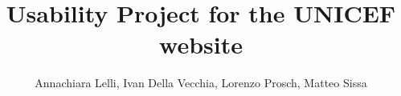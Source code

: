 \documentclass[a4paper,12pt]{article}
\author{Annachiara Lelli, Ivan Della Vecchia, Lorenzo Prosch, Matteo Sissa}
\title{Usability Project for the UNICEF website}
\newcommand{\inspectionDir}{root/1.Inspection/}
\newcommand{\utDir}{root/2.UserTesting/}
\newcommand{\conclusionDir}{root/3.Conclusion/}
\newcommand{\annexDir}{root/4.Annex/}
\begin{document}
	\maketitle
	\clearpage
	\tableofcontents
	
	\setlength{\tabcolsep}{1.5cm}
	\renewcommand{\arraystretch}{1.45}
	
	\renewcommand{\rmdefault}{phv}
	\renewcommand{\normalsize}{\fontsize{14}{17.4}\selectfont}
	
	
	
	
	
	
	
\end{document}

